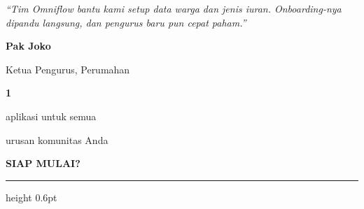 \documentclass[a4paper]{article}
\newcommand{\sectiontitle}[1]{%
    \vspace{10pt}%
    {\fontsize{13}{16}\selectfont\bfseries\color{BlueDark} #1}\par\vspace{3pt}%
    {\color{BluePrimary}\hrule height 0.6pt}\par\vspace{8pt}%
}
\begin{document}
\noindent
\begin{minipage}[t]{0.485\textwidth}
    \colorbox{BlueBg}{%
        \begin{minipage}{\dimexpr\linewidth-2\fboxsep\relax}
            {\fontsize{9.5}{13}\selectfont\color{TextDark}\textit{``Tim Omniflow bantu kami setup data warga dan jenis iuran. Onboarding-nya dipandu langsung, dan pengurus baru pun cepat paham.''}}\par\vspace{4pt}
            {\fontsize{8.5}{11}\selectfont\bfseries\color{BluePrimary} Pak Joko}\par
            {\fontsize{8}{10}\selectfont\color{TextLight} Ketua Pengurus, Perumahan}
        \end{minipage}}
\end{minipage}%
\hfill
\begin{minipage}[t]{0.485\textwidth}
    \colorbox{BlueBg}{%
        \begin{minipage}{\dimexpr\linewidth-2\fboxsep\relax}
            \begin{center}
                {\fontsize{20}{24}\selectfont\bfseries\color{BluePrimary} 1}\par
                {\fontsize{9.5}{12}\selectfont\color{TextDark} aplikasi untuk semua}\par
                {\fontsize{9.5}{12}\selectfont\color{TextDark} urusan komunitas Anda}
            \end{center}
        \end{minipage}}
\end{minipage}

\sectiontitle{SIAP MULAI?}
\end{document}
